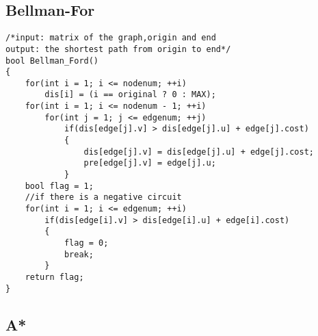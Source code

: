 \subsection{Bellman-For}
\begin{lstlisting}
/*input: matrix of the graph,origin and end
output: the shortest path from origin to end*/
bool Bellman_Ford()  
{  
    for(int i = 1; i <= nodenum; ++i)  
        dis[i] = (i == original ? 0 : MAX);  
    for(int i = 1; i <= nodenum - 1; ++i)  
        for(int j = 1; j <= edgenum; ++j)  
            if(dis[edge[j].v] > dis[edge[j].u] + edge[j].cost)  
            {  
                dis[edge[j].v] = dis[edge[j].u] + edge[j].cost;  
                pre[edge[j].v] = edge[j].u;  
            }  
    bool flag = 1; 
    //if there is a negative circuit
    for(int i = 1; i <= edgenum; ++i)  
        if(dis[edge[i].v] > dis[edge[i].u] + edge[i].cost)  
        {  
            flag = 0;  
            break;  
        }  
    return flag;  
}
\end{lstlisting}
\subsection{A*}
